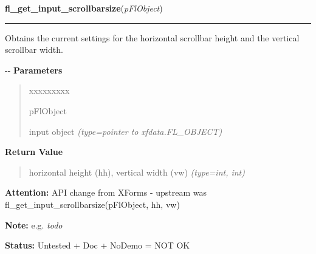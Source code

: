 \hspace{.8\funcindent}\begin{boxedminipage}{\funcwidth}

    \raggedright \textbf{fl\_get\_input\_scrollbarsize}(\textit{pFlObject})

    \vspace{-1.5ex}

    \rule{\textwidth}{0.5\fboxrule}
\setlength{\parskip}{2ex}

Obtains the current settings for the horizontal scrollbar height and
the vertical scrollbar width.

-{}-
\setlength{\parskip}{1ex}
      \textbf{Parameters}
      \vspace{-1ex}

      \begin{quote}
        \begin{Ventry}{xxxxxxxxx}

          \item[pFlObject]


input object
            {\it (type=pointer to xfdata.FL\_OBJECT)}

        \end{Ventry}

      \end{quote}

      \textbf{Return Value}
    \vspace{-1ex}

      \begin{quote}

horizontal height (hh), vertical width (vw)
      {\it (type=int, int)}

      \end{quote}

\textbf{Attention:} 
API change from XForms - upstream was
fl\_get\_input\_scrollbarsize(pFlObject, hh, vw)


\textbf{Note:} 
e.g. \emph{todo}


\textbf{Status:} 
Untested + Doc + NoDemo = NOT OK


    \end{boxedminipage}

    \label{xformslib:flinput:fl_set_input_xoffset}

    \vspace{0.5ex}

